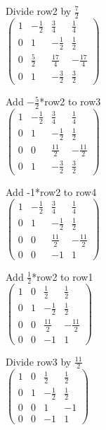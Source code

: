 \documentclass{article}
\begin{document}
Divide row2 by $\frac{7}{2}$\\
$
\left (
    \begin{matrix}
        1 & -\frac{1}{2} & \frac{3}{4} & \frac{1}{4}\\
        0 & 1 & -\frac{1}{2} & \frac{1}{2}\\
        0 & \frac{5}{2} & \frac{17}{4} & -\frac{17}{4}\\
        0 & 1 & -\frac{3}{2} & \frac{3}{2}
    \end{matrix}
\right )
$

Add $-\frac{5}{2}$*row2 to row3\\
$
\left (
    \begin{matrix}
        1 & -\frac{1}{2} & \frac{3}{4} & \frac{1}{4}\\
        0 & 1 & -\frac{1}{2} & \frac{1}{2}\\
        0 & 0 & \frac{11}{2} & -\frac{11}{2}\\
        0 & 1 & -\frac{3}{2} & \frac{3}{2}
    \end{matrix}
\right )
$

Add -1*row2 to row4\\
$
\left (
    \begin{matrix}
        1 & -\frac{1}{2} & \frac{3}{4} & \frac{1}{4}\\
        0 & 1 & -\frac{1}{2} & \frac{1}{2}\\
        0 & 0 & \frac{11}{2} & -\frac{11}{2}\\
        0 & 0 & -1 & 1
    \end{matrix}
\right )
$

Add $\frac{1}{2}$*row2 to row1\\
$
\left (
    \begin{matrix}
        1 & 0 & \frac{1}{2} & \frac{1}{2}\\
        0 & 1 & -\frac{1}{2} & \frac{1}{2}\\
        0 & 0 & \frac{11}{2} & -\frac{11}{2}\\
        0 & 0 & -1 & 1
    \end{matrix}
\right )
$

Divide row3 by $\frac{11}{2}$\\
$
\left (
    \begin{matrix}
        1 & 0 & \frac{1}{2} & \frac{1}{2}\\
        0 & 1 & -\frac{1}{2} & \frac{1}{2}\\
        0 & 0 & 1 & -1\\
        0 & 0 & -1 & 1
    \end{matrix}
\right )
$
\end{document}
